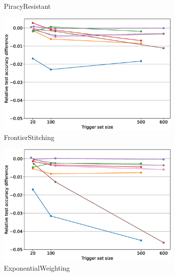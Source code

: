 \begin{figure}
\begin{subfigure}{0.4\linewidth}
        \caption{PiracyResistant}
        \label{fig:fidelity-piracy}
    \end{subfigure}
    \quad
    \begin{subfigure}{0.4\linewidth}
        \includegraphics[width=\linewidth]{images/fidelity/FrontierStitching_fidelity_rel_per_method.eps}
        \caption{FrontierStitching}
        \label{fig:fidelity-frontier}
    \end{subfigure}
    \quad
    \begin{subfigure}{0.4\linewidth}
        \includegraphics[width=\linewidth]{images/fidelity/ExponentialWeighting_fidelity_rel_per_method.eps}
        \caption{ExponentialWeighting}
        \label{fig:fidelity-exponential}
    \end{subfigure}
    \quad
    \begin{subfigure}{0.4\linewidth}

\end{subfigure}
\end{figure}
